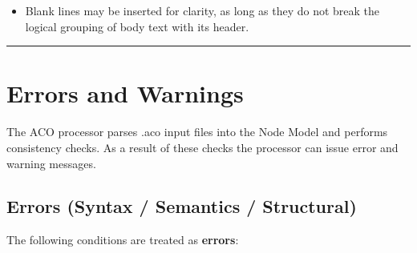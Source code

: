 \documentclass[11pt]{article}
\begin{document}
\begin{itemize}[leftmargin=2em]
  \item Blank lines may be inserted for clarity, as long as they do not break the logical grouping of body text with its header.
\end{itemize}

\bigskip
\hrule
\bigskip

\section{Errors and Warnings}
\label{sec:errors}

The ACO processor parses .aco input files into the Node Model and performs consistency checks.
As a result of these checks the processor can issue error and warning messages.

\subsection{Errors (Syntax / Semantics / Structural)}

The following conditions are treated as \textbf{errors}:
\end{document}
